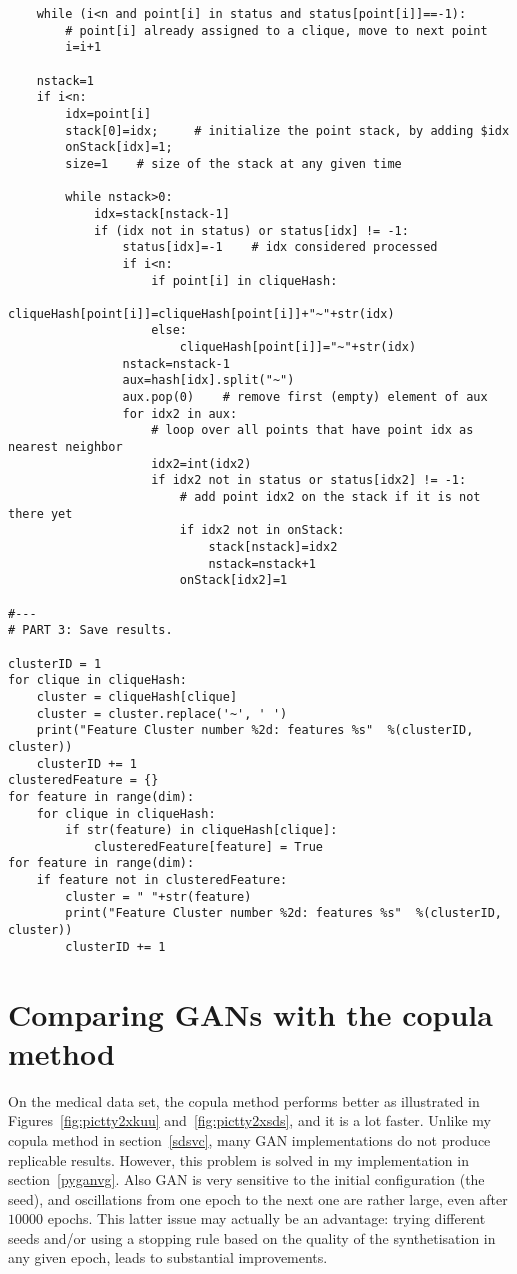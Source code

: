 \documentclass[oneside,10pt]{book}
\begin{document}
\begin{lstlisting}
    while (i<n and point[i] in status and status[point[i]]==-1):
        # point[i] already assigned to a clique, move to next point
        i=i+1

    nstack=1
    if i<n:
        idx=point[i]
        stack[0]=idx;     # initialize the point stack, by adding $idx
        onStack[idx]=1;
        size=1    # size of the stack at any given time

        while nstack>0:
            idx=stack[nstack-1]
            if (idx not in status) or status[idx] != -1:
                status[idx]=-1    # idx considered processed
                if i<n:
                    if point[i] in cliqueHash:
                        cliqueHash[point[i]]=cliqueHash[point[i]]+"~"+str(idx)
                    else:
                        cliqueHash[point[i]]="~"+str(idx)
                nstack=nstack-1
                aux=hash[idx].split("~")
                aux.pop(0)    # remove first (empty) element of aux
                for idx2 in aux:
                    # loop over all points that have point idx as nearest neighbor
                    idx2=int(idx2)
                    if idx2 not in status or status[idx2] != -1:
                        # add point idx2 on the stack if it is not there yet
                        if idx2 not in onStack:
                            stack[nstack]=idx2
                            nstack=nstack+1
                        onStack[idx2]=1

#---
# PART 3: Save results.

clusterID = 1
for clique in cliqueHash:
    cluster = cliqueHash[clique]
    cluster = cluster.replace('~', ' ')
    print("Feature Cluster number %2d: features %s"  %(clusterID, cluster))
    clusterID += 1
clusteredFeature = {}
for feature in range(dim):
    for clique in cliqueHash:
        if str(feature) in cliqueHash[clique]:
            clusteredFeature[feature] = True
for feature in range(dim):
    if feature not in clusteredFeature:
        cluster = " "+str(feature)
        print("Feature Cluster number %2d: features %s"  %(clusterID, cluster))
        clusterID += 1
\end{lstlisting}

\section{Comparing GANs with the copula method}

On the medical data set, the copula method performs better as illustrated
 in Figures~\ref{fig:pictty2xkuu} and~\ref{fig:pictty2xsds}, and it is a lot faster. Unlike my copula method
 in section~\ref{sdsvc}, many GAN implementations do not
 produce replicable results. However, this problem is solved in my implementation in section~\ref{pyganvg}. Also GAN is very sensitive to
 the initial configuration (the seed), and oscillations from one epoch to the next one are rather large, even after $\num{10000}$ epochs.
 This latter issue may actually be an advantage: trying different seeds and/or using a stopping rule based on the quality of the synthetisation
 in any given epoch, leads to substantial improvements.
\end{document}
